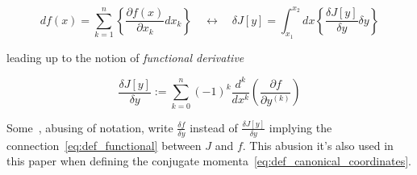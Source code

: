 \begin{equation*}
  df(x) = \sum_{k=1}^{n}
  \left\{ \frac{\partial f(x)}{\partial x_k} dx_k \right\}
  \quad \longleftrightarrow \quad
  \delta J[y] = \int_{x_1}^{x_2} dx
  \left\{ \frac{\delta J[y]}{\delta y} \delta y \right\}
\end{equation*}

leading up to the notion of \emph{functional derivative}

\begin{equation} \label{eq:functional_derivative}
  \frac{\delta J[y]}{\delta y} := \sum_{k = 0}^{n} {(-1)}^k \frac{d^k}{dx^k}
  \left( \frac{\partial f}{\partial y^{(k)}}\right)
\end{equation}

Some~\cite{Chen13}, abusing of notation,  write $\frac{\delta f}{\delta y}$
instead of $\frac{\delta J[y]}{\delta y}$ implying the
connection~\eqref{eq:def_functional} between $J$ and $f$. This abusion it's
also used in this paper when defining the conjugate
momenta~\eqref{eq:def_canonical_coordinates}.
